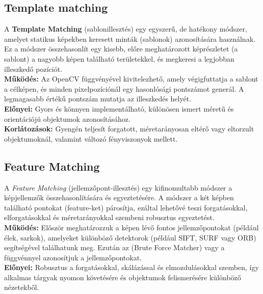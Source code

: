 \subsection{Template matching } \label{sec:soft_template}

A \textbf{Template Matching} \cite{templatematching} (sablonillesztés) egy egyszerű, de hatékony módszer, amelyet statikus képekben keresett minták (sablonok) azonosítására használnak. Ez a módszer összehasonlít egy kisebb, előre meghatározott képrészletet (a sablont) a nagyobb képen található területekkel, és megkeresi a legjobban illeszkedő pozíciót.\\

\textbf{Működés:} Az OpenCV  függvényével kivitelezhető, amely végigfuttatja a sablont a célképen, és minden pixelpozíciónál egy hasonlósági pontszámot generál. A legmagasabb értékű pontszám mutatja az illeszkedés helyét.\\

\textbf{Előnyei:} Gyors és könnyen implementálható, különösen ismert méretű és orientációjú objektumok azonosításához.\\

\textbf{Korlátozások:} Gyengén teljesít forgatott, méretarányosan eltérő vagy eltorzult objektumoknál, valamint változó fényviszonyok mellett.

\pagebreak

\subsection{Feature Matching } \label{sec:soft_feature}

A \textsl{Feature Matching} \cite{featurematching} (jellemzőpont-illesztés) egy kifinomultabb módszer a képjellemzők összehasonlítására és egyeztetésére. A módszer a két képben található pontokat (feature-ket) párosítja, ezáltal lehetővé teszi forgatásokkal, elforgatásokkal és méretarányokkal szembeni robusztus egyeztetést.\\

\textbf{Működés:} Először meghatározzuk a képen lévő fontos jellemzőpontokat (például élek, sarkok), amelyeket különböző detektorok (például SIFT, SURF vagy ORB) segítségével találhatunk meg. Ezután az  (Brute Force Matcher) vagy a  függvénnyel azonosítjuk a jellemzőpontokat.\\

\textbf{Előnyei:} Robusztus a forgatásokkal, skálázással és elmozdulásokkal szemben, így alkalmas tárgyak nyomon követésére és objektumok felismerésére különböző nézetekből.\\

